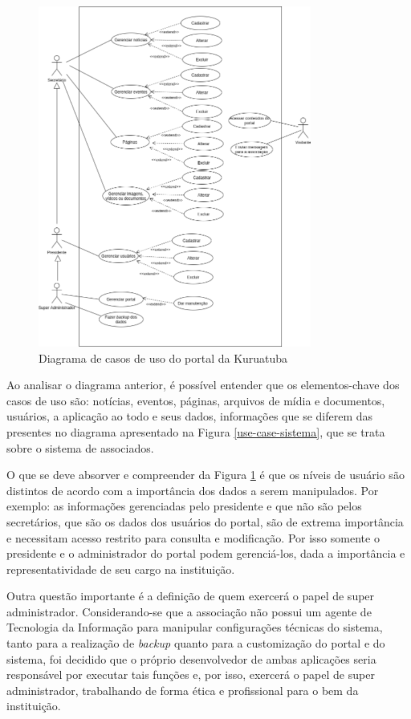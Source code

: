 \begin{figure}[htb]
 \centering
 \caption{Diagrama de casos de uso do portal da Kuruatuba}
 \includegraphics[width=0.8\textwidth]{figuras/use-case-portal.png}
 
 \label{use-case-portal}
\end{figure}

Ao analisar o diagrama anterior, é possível entender que os elementos-chave dos casos de uso são: notícias, eventos, páginas, arquivos de mídia e documentos, usuários, a aplicação ao todo e seus dados, informações que se diferem das presentes no diagrama apresentado na Figura \ref{use-case-sistema}, que se trata sobre o sistema de associados. 

O que se deve absorver e compreender da Figura \ref{use-case-portal} é que os níveis de usuário são distintos de acordo com a importância dos dados a serem manipulados. Por exemplo: as informações gerenciadas pelo presidente e que não são pelos secretários, que são os dados dos usuários do portal, são de extrema importância e necessitam acesso restrito para consulta e modificação. Por isso somente o presidente e o administrador do portal podem gerenciá-los, dada a importância e representatividade de seu cargo na instituição. 

Outra questão importante é a definição de quem exercerá o papel de super administrador. Considerando-se que a associação não possui um agente de Tecnologia da Informação para manipular configurações técnicas do sistema, tanto para a realização de \textit{backup} quanto para a customização do portal e do sistema, foi decidido que o próprio desenvolvedor de ambas aplicações seria responsável por executar tais funções e, por isso, exercerá o papel de super administrador, trabalhando de forma ética e profissional para o bem da instituição.

